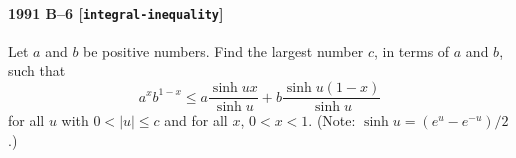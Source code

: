 \paragraph{1991 B--6 \textnormal{[\texttt{integral-inequality}]}}
Let $a$ and $b$ be positive numbers. Find the largest number $c$, in
terms of $a$ and $b$, such that
\[
a^x b^{1-x} \leq a \frac{\sinh ux}{\sinh u} + b \frac{\sinh u(1-x)}{\sinh u}
\]
for all $u$ with $0 < |u| \leq c$ and for all $x$, $0 < x < 1$. (Note:
$\sinh u = (e^u - e^{-u})/2$.)
